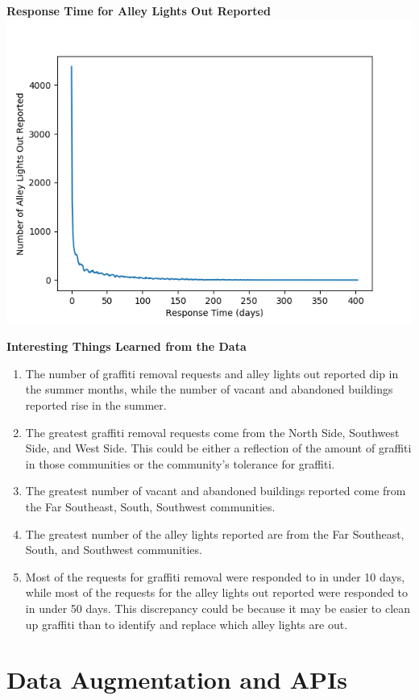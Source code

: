 \documentclass[letterpaper,12pt]{article}
\begin{document}
\newpage

\noindent \textbf{Response Time for Alley Lights Out Reported} \\
\includegraphics[scale=1]{responseoveralleys.png}

\noindent \textbf{Interesting Things Learned from the Data}
\begin{enumerate}
\item The number of graffiti removal requests and alley lights out reported dip in the summer months, while the number of vacant and abandoned buildings reported rise in the summer.
\item The greatest graffiti removal requests come from the North Side, Southwest Side, and West Side. This could be either a reflection of the amount of graffiti in those communities or the community's tolerance for graffiti.
\item The greatest number of vacant and abandoned buildings reported come from the Far Southeast, South, Southwest communities.
\item The greatest number of the alley lights reported are from the Far Southeast, South, and Southwest communities.
\item Most of the requests for graffiti removal were responded to in under 10 days, while most of the requests for the alley lights out reported were responded to in under 50 days. This discrepancy could be because it may be easier to clean up graffiti than to identify and replace which alley lights are out.
\end{enumerate}

\section{Data Augmentation and APIs}
\end{document}
